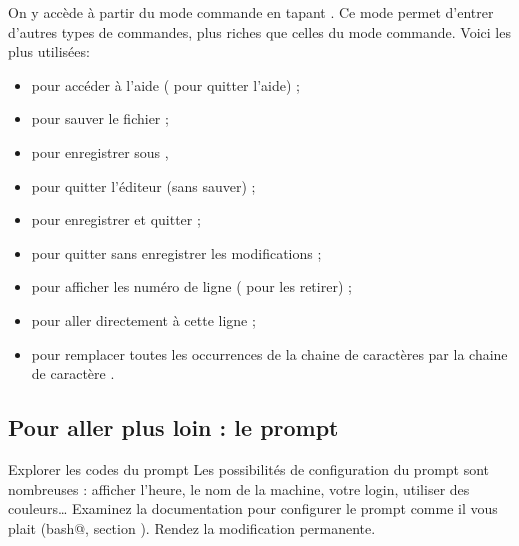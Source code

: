 \documentclass[a4paper,11pt]{style-esi/td}
\begin{document}
				On y accède à partir du mode commande en tapant \kbd{:}.
				Ce mode permet d'entrer d'autres types de commandes,
				plus riches que celles du mode commande. 
				Voici les plus utilisées:
				\begin{itemize}
				\item {} pour accéder à l'aide ( pour quitter l'aide) ;
				\item {} pour sauver le fichier ;
				\item {} pour enregistrer sous ,
				\item {} pour quitter l'éditeur (sans sauver) ;
				\item {} pour enregistrer et quitter ;
				\item {} pour quitter sans enregistrer les modifications ;
				\item {} pour afficher les numéro de ligne 
					( pour les retirer) ;
				\item {} pour aller directement à cette ligne ;
				\item {} 
					pour remplacer toutes les occurrences de la chaine de caractères 
					 par la chaine de caractère .
				\end{itemize}

	\subsection{Pour aller plus loin : le prompt}

		\begin{Exercice}{Explorer les codes du prompt}
			Les possibilités de configuration du prompt sont nombreuses : 
			afficher l'heure, le nom de la machine, votre login,
			utiliser des couleurs\dots{}
			Examinez la documentation pour configurer le prompt comme il 
			vous plait (\verb@man bash@, section \verb@PROMPTING@).
			Rendez la modification permanente.
		\end{Exercice}	
		
\end{document}
